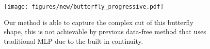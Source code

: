 \begin{figure} %
\centering
\texttt{[image: figures/new/butterfly\_progressive.pdf]}


\caption{Our method is able to capture the complex cut of this butterfly shape, this is not achievable by previous data-free method \cite{Modi:2024:Simplicits} that uses traditional MLP due to the built-in continuity.}
\label{fig:butterly} 
\end{figure}


